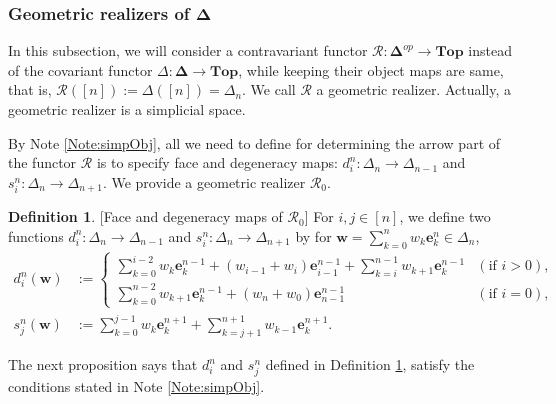 \documentclass[12pt, a4paper]{amsart}
\theoremstyle{plain}
\theoremstyle{definition}
\newtheorem{defn}[thm]{Definition}
\numberwithin{figure}{section}
\numberwithin{table}{section}
\numberwithin{equation}{section}
\newcommand{\Top}{\mathbf{Top}}
\newcommand{\bDelta}{\mathbf{\Delta}}
\begin{document}
\subsubsection{Geometric realizers of $\bDelta$}
\label{sec:GeoReal}

In this subsection,
we will consider a contravariant functor
$
\mathcal{R}
	:
\bDelta^{op} \to \Top
$
instead of the covariant functor
$
\Delta
	:
\bDelta \to \Top
$,
while keeping their object maps are same, that is,
$
\mathcal{R}([n]) := \Delta([n]) = \Delta_n.
$
We call $\mathcal{R}$ a geometric realizer.
Actually, a geometric realizer is a simplicial space.


By Note \ref{Note:simpObj},
all we need to define 
for determining the arrow part of the functor $\mathcal{R}$
is to
specify 
face and degeneracy maps:
$ d^{n}_i : \Delta_n \to \Delta_{n-1} $
and
$ s^{n}_i : \Delta_n \to \Delta_{n+1} $.
We provide a
geometric realizer
$\mathcal{R}_0$.





\begin{defn}{[Face and degeneracy maps of $\mathcal{R}_0$]}
\label{defn:faceDegeMapsForRzero}
For
$i, j \in [n]$,
we define two functions
$ d^{n}_i : \Delta_n \to \Delta_{n-1} $
and
$ s^{n}_i : \Delta_n \to \Delta_{n+1} $
by
for
$
\mathbf{w}
	=
\sum_{k=0}^n
	w_k
	\mathbf{e}^n_k
	\in
\Delta_n
$,
\begin{align}
\label{eq:XdZero}
d^{n}_i(\mathbf{w})
	&:=
\begin{cases}
	\sum_{k=0}^{i-2}
		w_k \mathbf{e}^{n-1}_k
			+
	(w_{i-1} + w_i) \mathbf{e}^{n-1}_{i-1}
			+
	\sum_{k=i}^{n-1}
		w_{k+1} \mathbf{e}^{n-1}_k 
	& (\textrm{if } i > 0), 
				\\
	\sum_{k=0}^{n-2}
		w_{k+1} \mathbf{e}^{n-1}_k
			+
	(w_{n} + w_0) \mathbf{e}^{n-1}_{n-1}
	& (\textrm{if } i = 0), 
\end{cases}
			\\
\label{eq:XsZero}
s^{n}_j(\mathbf{w})
	&:=
	\sum_{k=0}^{j-1}
		w_{k} \mathbf{e}^{n+1}_k
			+
	\sum_{k=j+1}^{n+1}
		w_{k-1} \mathbf{e}^{n+1}_k   .
\end{align}

\end{defn}



The next proposition says that
$d^n_i$
and
$s^n_j$
defined in
Definition \ref{defn:faceDegeMapsForRzero},
satisfy
the conditions stated in 
Note \ref{Note:simpObj}.
\end{document}
